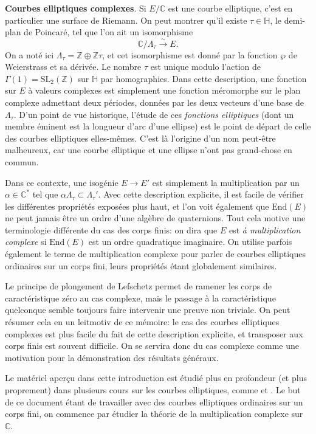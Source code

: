 \documentclass[11pt,a4paper]{article}
\newcommand{\Z}{\mathbb{Z}}
\newcommand{\C}{\mathbb{C}}
\renewcommand{\H}{\mathbb{H}}
\newcommand{\vers}{\longrightarrow}
\newcommand{\End}{\mathrm{End}}
\renewcommand{\v}{\vspace{5mm}}
\theoremstyle{definition}
\begin{document}
\v

\textbf{Courbes elliptiques complexes}. Si $E/\C$ est une courbe elliptique, c'est en particulier une surface de Riemann. On peut montrer qu'il existe $\tau\in \H$, le demi-plan de Poincaré, tel que l'on ait un isomorphisme
$$\C/\Lambda_\tau \overset{\sim}{\vers} E.$$
On a noté ici $\Lambda_\tau = \Z\oplus \Z\tau$, et cet isomorphisme est donné par la fonction $\wp$ de Weierstrass et sa dérivée. Le nombre $\tau$ est unique modulo l'action de $\Gamma(1) = \mathrm{SL}_2(\Z)$ sur $\H$ par homographies. Dans cette description, une fonction sur $E$ à valeurs complexes est simplement une fonction méromorphe sur le plan complexe admettant deux périodes, données par les deux vecteurs d'une base de $\Lambda_\tau$. D'un point de vue historique, l'étude de ces \emph{fonctions elliptiques} (dont un membre éminent est la longueur d'arc d'une ellipse) est le point de départ de celle des courbes elliptiques elles-mêmes. C'est là l'origine d'un nom peut-être malheureux, car une courbe elliptique et une ellipse n'ont pas grand-chose en commun.

Dans ce contexte, une isogénie $E\vers E'$ est simplement la multiplication par un $\alpha\in \C^*$ tel que $\alpha \Lambda_\tau \subset \Lambda_\tau'$. Avec cette description explicite, il est facile de vérifier les différentes propriétés exposées plus haut, et l'on voit également que $\End(E)$ ne peut jamais être un ordre d'une algèbre de quaternions. Tout cela motive une terminologie différente du cas des corps finis: on dira que $E$ est \emph{à multiplication complexe} si $\End(E)$ est un ordre quadratique imaginaire.
On utilise parfois également le terme de multiplication complexe pour parler de courbes elliptiques ordinaires sur un corps fini, leurs propriétés étant globalement similaires.

Le principe de plongement de Lefschetz permet de ramener les corps de caractéristique zéro au cas complexe, mais le passage à la caractéristique quelconque semble toujours faire intervenir une preuve non triviale. On peut résumer cela en un leitmotiv de ce mémoire: le cas des courbes elliptiques complexes est plus facile du fait de cette description explicite, et transposer aux corps finis est souvent difficile. On se servira donc du cas complexe comme une motivation pour la démonstration des résultats généraux.

\v

Le matériel aperçu dans cette introduction est étudié plus en profondeur (et plus proprement) dans plusieurs cours sur les courbes elliptiques, comme \cite{Nekovar} et \cite{Stroh}.
Le but de ce document étant de travailler avec des courbes elliptiques ordinaires sur un corps fini, on commence par étudier la théorie de la multiplication complexe sur $\C$.
\end{document}

